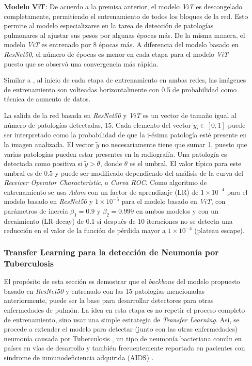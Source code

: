 \begin{enumerate}
        \textbf{Modelo ViT}: De acuerdo a la premisa anterior, el modelo \textit{ViT} es descongelado completamente,
        permitiendo el entrenamiento de todos los bloques de la red. Esto permite al modelo especializarse en la
        tarea de detección de patologías pulmonares al ajustar sus pesos por algunas épocas más. De la misma manera,
        el modelo \textit{ViT} es entrenado por 8 épocas más. A diferencia del modelo basado en \textit{ResNet50}, el
        número de épocas es menor en cada etapa para el modelo \textit{ViT} puesto que se observó una convergencia
        más rápida.


\end{enumerate}

Similar a \citeauthor{rajpurkar2018deep}, al inicio de cada etapa de entrenamiento en ambas redes,
las imágenes de entrenamiento son volteadas horizontalmente con 0.5 de probabilidad como técnica de
aumento de datos.

La salida de la red basada en \textit{ResNet50} y \textit{ViT} es un vector de tamaño igual al número
de patologías detectadas, 15. Cada elemento del vector $\tilde y_i \in [0,1]$ puede ser interpretado
como la probabilidad de que la i-ésima patología esté presente en la imagen analizada. El vector
$\tilde y$ no necesariamente tiene que sumar 1, puesto que varias patologías pueden estar presentes
en la radiografía. Una patología es detectada como positiva si $\tilde y > \theta$, donde $\theta$ es
el umbral. El valor típico para este umbral es de $0.5$ y puede ser modificado dependiendo del análisis
de la curva del \textit{Receiver Operator Characteristic}, o \textit{Curva ROC}. Como algoritmo de
entrenamiento se usa \emph{Adam} \cite{kingma2017adam} con un factor de aprendizaje (LR) de
$1\times 10^{-4}$ para el modelo basado en \textit{ResNet50} y $1\times 10^{-5}$ para el modelo basado
en \textit{ViT}, con parámetros de inercia $\beta_1=0.9$ y $\beta_2=0.999$ en ambos modelos y con un
decaimiento (LR-decay) de $0.1$ si después de 10 iteraciones no se detecta una reducción en el valor
de la función de pérdida mayor a $1\times 10^{-4}$ (plateau escape).


\subsubsection{Transfer Learning para la detección de Neumonía por Tuberculosis}

El propósito de esta sección es demostrar que el \textit{backbone} del modelo propuesto basado en
\textit{ResNet50} y entrenado con las 15 patologías mencionadas anteriormente, puede ser la base para
desarrollar detectores para otras enfermedades de pulmón. La idea en esta etapa es no repetir el proceso
completo de entrenamiento, sino usar una simple estrategia de \textit{Transfer Learning}. Así, se procede
a extender el modelo para detectar (junto con las otras enfermedades) neumonía causada por Tuberculosis
\cite{stirenko2018chest}, un tipo de neumonía bacteriana común en países en vías de desarrollo y también
frecuentemente reportada en pacientes con síndrome de inmunodeficiencia adquirida (AIDS)
\cite{matsuura2018tuberculous}.


